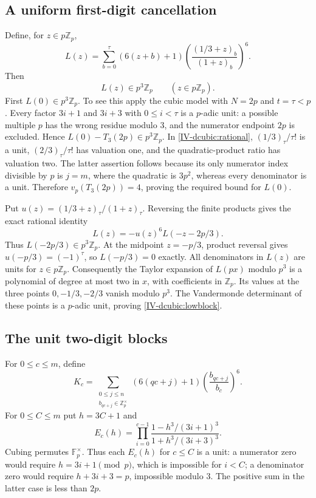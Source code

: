 \documentclass[11pt,letterpaper]{article}
\numberwithin{equation}{section}
\begin{document}
\subsection{A uniform first-digit cancellation}
Define, for $z\in p\mathbb Z_p$,
\[
 L(z)=\sum_{b=0}^{\tau}(6(z+b)+1)
 \left(\frac{(1/3+z)_b}{(1+z)_b}\right)^6.
\]
Then
\begin{equation}\label{IV-dcubic:lowblock}
 L(z)\in p^3\mathbb Z_p\qquad(z\in p\mathbb Z_p).
\end{equation}
First $L(0)\in p^3\mathbb Z_p$. To see this apply the cubic model
with $N=2p$ and $t=\tau<p$. Every factor $3i+1$ and $3i+3$ with
$0\le i<\tau$ is a $p$-adic unit: a possible multiple $p$ has the
wrong residue modulo $3$, and the numerator endpoint $2p$ is
excluded. Hence $L(0)-T_3(2p)\in p^3\mathbb Z_p$.
In \eqref{IV-dcubic:rational}, $(1/3)_\tau/\tau!$ is a unit,
$(2/3)_\tau/\tau!$ has valuation one, and the quadratic-product
ratio has valuation two. The latter assertion follows because its
only numerator index divisible by $p$ is $j=m$, where the quadratic
is $3p^2$, whereas every denominator is a unit. Therefore
$v_p(T_3(2p))=4$, proving the required bound for $L(0)$.

Put $u(z)=(1/3+z)_\tau/(1+z)_\tau$. Reversing the finite products
gives the exact rational identity
\[
 L(z)=-u(z)^6L(-z-2p/3).
\]
Thus $L(-2p/3)\in p^3\mathbb Z_p$. At the midpoint $z=-p/3$,
product reversal gives $u(-p/3)=(-1)^\tau$, so $L(-p/3)=0$ exactly.
All denominators in $L(z)$ are units for $z\in p\mathbb Z_p$.
Consequently the Taylor expansion of $L(px)$ modulo $p^3$ is a
polynomial of degree at most two in $x$, with coefficients in
$\mathbb Z_p$. Its values at the three points
$0,-1/3,-2/3$ vanish modulo $p^3$. The Vandermonde determinant of
these points is a $p$-adic unit, proving \eqref{IV-dcubic:lowblock}.

\subsection{The unit two-digit blocks}
For $0\le c\le m$, define
\[
 K_c=\sum_{\substack{0\le j\le n\\b_{qc+j}\in\mathbb Z_p^\times}}
 (6(qc+j)+1)\left(\frac{b_{qc+j}}{b_c}\right)^6.
\]
For $0\le C\le m$ put $h=3C+1$ and
\[
 E_c(h)=\prod_{i=0}^{c-1}
 \frac{1-h^3/(3i+1)^3}{1+h^3/(3i+3)^3}.
\]
Cubing permutes $\mathbb F_p^\times$. Thus each $E_c(h)$ for
$c\le C$ is a unit: a numerator zero would require $h=3i+1\pmod p$,
which is impossible for $i<C$; a denominator zero would require
$h+3i+3=p$, impossible modulo $3$. The positive sum in the latter
case is less than $2p$.
\end{document}
